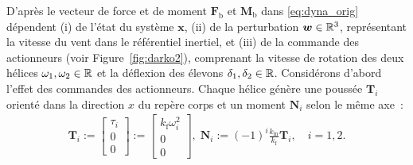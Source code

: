 D'après \cite{lustosaHal-03035938} le vecteur de force et de moment $\boldsymbol{F}_{\text{b}}$ et $\boldsymbol{M}_{\text{b}}$ dans \eqref{eq:dyna_orig} dépendent  (i) de l'état du système $\boldsymbol{x}$, (ii) de la perturbation $\boldsymbol{w} \in {\mathbb R}^3$, représentant la vitesse du vent dans le référentiel inertiel, et (iii) de la commande des actionneurs (voir Figure~\ref{fig:darko2}), comprenant la vitesse de rotation des deux hélices $\omega_1, \omega_2 \in {\mathbb R}$ et la déflexion des élevons $\delta_1, \delta_2\in {\mathbb R}$.
Considérons d'abord l'effet des commandes des actionneurs. Chaque hélice génère une poussée $\boldsymbol{T}_i$ orienté dans la direction $x$ du repère corps et un moment $\boldsymbol{N}_i$ selon le même axe :
\begin{align}
\label{eq:thrust}
\boldsymbol{T}_{i} \!:=\! \begin{bmatrix} \tau_{i} \\ 0 \\ 0 \end{bmatrix} \!:=\!
\begin{bmatrix} k_{\text{f}}\omega_{i}^{2} \\ 0 \\ 0 \end{bmatrix}\! , \;
\boldsymbol{N}_{i} \!:=\! (-1)^{i}  \frac{k_{\text{m}} }{k_{\text{f}}}\boldsymbol{T}_{i}, \quad i=1,2 .
\end{align} 

